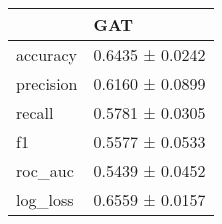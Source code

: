 \begin{tabular}{ll}
\toprule
 & GAT \\
\midrule
accuracy & 0.6435 ± 0.0242 \\
precision & 0.6160 ± 0.0899 \\
recall & 0.5781 ± 0.0305 \\
f1 & 0.5577 ± 0.0533 \\
roc_auc & 0.5439 ± 0.0452 \\
log_loss & 0.6559 ± 0.0157 \\
\bottomrule
\end{tabular}
